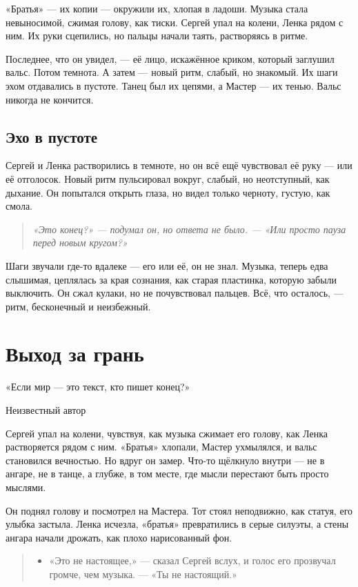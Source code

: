 \documentclass[12pt,a4paper]{book}
\newenvironment{dialogue}{\begin{quote}\itshape\begin{itemize}\item[]}{\end{itemize}\end{quote}}
\newenvironment{innerthought}{\begin{quote}\small\itshape}{\end{quote}}
\begin{document}
«Братья» --- их копии --- окружили их, хлопая в ладоши. Музыка стала невыносимой, сжимая голову, как тиски. Сергей упал на колени, Ленка рядом с ним. Их руки сцепились, но пальцы начали таять, растворяясь в ритме.

Последнее, что он увидел, --- её лицо, искажённое криком, который заглушил вальс. Потом темнота. А затем --- новый ритм, слабый, но знакомый. Их шаги эхом отдавались в пустоте. Танец был их цепями, а Мастер --- их тенью. Вальс никогда не кончится.

\section{Эхо в пустоте}

Сергей и Ленка растворились в темноте, но он всё ещё чувствовал её руку --- или её отголосок. Новый ритм пульсировал вокруг, слабый, но неотступный, как дыхание. Он попытался открыть глаза, но видел только черноту, густую, как смола.

\begin{innerthought}
«Это конец?» --- подумал он, но ответа не было. --- «Или просто пауза перед новым кругом?»
\end{innerthought}

Шаги звучали где-то вдалеке --- его или её, он не знал. Музыка, теперь едва слышимая, цеплялась за края сознания, как старая пластинка, которую забыли выключить. Он сжал кулаки, но не почувствовал пальцев. Всё, что осталось, --- ритм, бесконечный и неизбежный.

\chapter{Выход за грань}
\epigraph{«Если мир — это текст, кто пишет конец?»}{Неизвестный автор}

Сергей упал на колени, чувствуя, как музыка сжимает его голову, как Ленка растворяется рядом с ним. «Братья» хлопали, Мастер ухмылялся, и вальс становился вечностью. Но вдруг он замер. Что-то щёлкнуло внутри --- не в ангаре, не в танце, а глубже, в том месте, где мысли перестают быть просто мыслями.

Он поднял голову и посмотрел на Мастера. Тот стоял неподвижно, как статуя, его улыбка застыла. Ленка исчезла, «братья» превратились в серые силуэты, а стены ангара начали дрожать, как плохо нарисованный фон.

\begin{dialogue}
«Это не настоящее,» --- сказал Сергей вслух, и голос его прозвучал громче, чем музыка. --- «Ты не настоящий.»
\end{dialogue}
\end{document}
